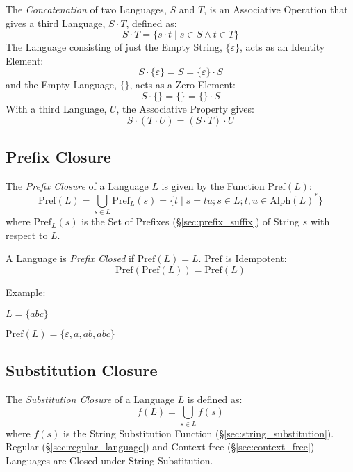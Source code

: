 The \emph{Concatenation} of two Languages, $S$ and $T$, is an Associative
Operation that gives a third Language, $S \cdot T$, defined as:
\[
  S \cdot T = \{s \cdot t\;|\; s \in S \wedge t \in T\}
\]
The Language consisting of just the Empty String, $\{\varepsilon\}$, acts as an
Identity Element:
\[
  S \cdot \{\varepsilon\} = S = \{\varepsilon\} \cdot S
\]
and the Empty Language, $\{\}$, acts as a Zero Element:
\[
  S \cdot \{\} = \{\} = \{\} \cdot S
\]
With a third Language, $U$, the Associative Property gives:
\[
  S \cdot (T \cdot U) = (S \cdot T) \cdot U
\]



\subsection{Prefix Closure}\label{sec:prefix_closure}

The \emph{Prefix Closure} of a Language $L$ is given by the Function
$\mathrm{Pref}(L)$:
\[
  \mathrm{Pref}(L) = \bigcup_{s \in L} \mathrm{Pref}_L(s) =
  \{ t\;|\;s = tu; s \in L; t,u \in \mathrm{Alph}(L)^* \}
\]
where $\mathrm{Pref}_L(s)$ is the Set of Prefixes (\S\ref{sec:prefix_suffix}) of
String $s$ with respect to $L$.

A Language is \emph{Prefix Closed} if $\mathrm{Pref}(L) = L$. $\mathrm{Pref}$ is
Idempotent:
\[
  \mathrm{Pref}(\mathrm{Pref}(L)) = \mathrm{Pref}(L)
\]

Example:

$L = \{abc\}$

$\mathrm{Pref}(L) = \{\varepsilon, a, ab, abc\}$



\subsection{Substitution Closure}\label{sec:substitution_closure}

The \emph{Substitution Closure} of a Language $L$ is defined as:
\[
  f(L) = \bigcup_{s \in L} f(s)
\]
where $f(s)$ is the String Substitution Function
(\S\ref{sec:string_substitution}). Regular (\S\ref{sec:regular_language}) and
Context-free (\S\ref{sec:context_free}) Languages are Closed under String
Substitution.



